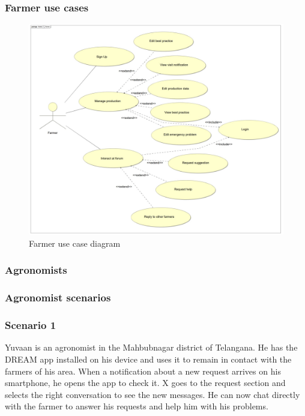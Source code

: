 \subsubsection*{Farmer use cases}
\begin{figure}[H]
	\centering
    \includegraphics[page=1, width=\textwidth]{Images/ud_fa.JPG}

	\caption{\label{fig:f_use_case_diagram}Farmer use case diagram}

\end{figure}
\label{sect:farmer_requirements}

\newpage



\subsubsection{Agronomists}
\subsubsection*{Agronomist scenarios}
\subsubsection*{Scenario 1}
Yuvaan is an agronomist in the Mahbubnagar district of Telangana. He has the DREAM app installed on his device and uses it to remain in contact with the farmers of his area. When a notification about a new request arrives on his smartphone, he opens the app to check it. X goes to the request section and selects the right conversation to see the new messages. He can now chat directly with the farmer to answer his requests and help him with his problems.

